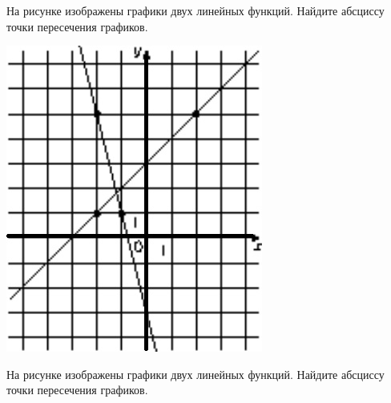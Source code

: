 \begin{homework}[number=2]
	\begin{listofex}
		\item 
		\begin{minipage}[t]{0.43\textwidth}
			На рисунке изображены графики двух линейных функций. Найдите абсциссу точки пересечения графиков.
		\end{minipage}
		\begin{minipage}[c]{0.1\textwidth}
			\includegraphics[align=t, width=\textwidth]{../pics/G102M4H2-1.jpg}
		\end{minipage}
		\item 
		\begin{minipage}[t]{0.43\textwidth}
			На рисунке изображены графики двух линейных функций. Найдите абсциссу точки пересечения графиков.
		\end{minipage}
		\begin{minipage}[c]{0.1\textwidth}

\end{minipage}
\end{listofex}
\end{homework}
